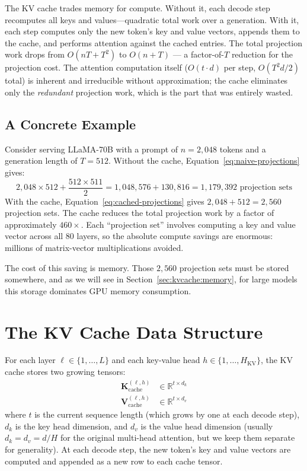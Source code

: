 \begin{insightbox}
The KV cache trades memory for compute. Without it, each decode step recomputes all keys and values---quadratic total work over a generation. With it, each step computes only the new token's key and value vectors, appends them to the cache, and performs attention against the cached entries. The total projection work drops from $O(nT + T^2)$ to $O(n + T)$ --- a factor-of-$T$ reduction for the projection cost. The attention computation itself ($O(t \cdot d)$ per step, $O(T^2 d / 2)$ total) is inherent and irreducible without approximation; the cache eliminates only the \emph{redundant} projection work, which is the part that was entirely wasted.
\end{insightbox}

\subsection{A Concrete Example}

Consider serving LLaMA-70B with a prompt of $n = 2{,}048$ tokens and a generation length of $T = 512$. Without the cache, Equation~\ref{eq:naive-projections} gives:
\[
2{,}048 \times 512 + \frac{512 \times 511}{2} = 1{,}048{,}576 + 130{,}816 = 1{,}179{,}392 \text{ projection sets}
\]
With the cache, Equation~\ref{eq:cached-projections} gives $2{,}048 + 512 = 2{,}560$ projection sets. The cache reduces the total projection work by a factor of approximately $460 \times$. Each ``projection set'' involves computing a key and value vector across all 80 layers, so the absolute compute savings are enormous: millions of matrix-vector multiplications avoided.

The cost of this saving is memory. Those $2{,}560$ projection sets must be stored somewhere, and as we will see in Section~\ref{sec:kvcache:memory}, for large models this storage dominates GPU memory consumption.

\section{The KV Cache Data Structure}
\label{sec:kvcache:structure}

For each layer $\ell \in \{1, \ldots, L\}$ and each key-value head $h \in \{1, \ldots, H_{\text{KV}}\}$, the KV cache stores two growing tensors:
\begin{align}
\mathbf{K}^{(\ell,h)}_{\text{cache}} &\in \mathbb{R}^{t \times d_k} \\
\mathbf{V}^{(\ell,h)}_{\text{cache}} &\in \mathbb{R}^{t \times d_v}
\end{align}
where $t$ is the current sequence length (which grows by one at each decode step), $d_k$ is the key head dimension, and $d_v$ is the value head dimension (usually $d_k = d_v = d / H$ for the original multi-head attention, but we keep them separate for generality). At each decode step, the new token's key and value vectors are computed and appended as a new row to each cache tensor.

